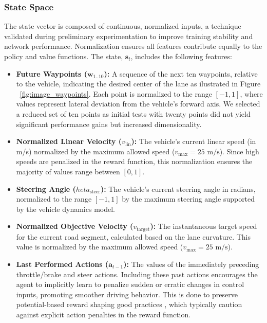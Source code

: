 \documentclass[]{interact}
\begin{document}
\subsubsection{State Space}
The state vector is composed of continuous, normalized inputs, a technique validated during preliminary experimentation to improve training stability and network performance. Normalization ensures all features contribute equally to the policy and value functions. The state, $\mathbf{s}_t$, includes the following features:

\begin{itemize}

    \item \textbf{Future Waypoints ($\mathbf{w}_{1..10}$):} A sequence of the next ten waypoints, relative to the vehicle, indicating the desired center of the lane as ilustrated in Figure ~\ref{fig:image_waypoints}. Each point is normalized to the range $[-1, 1]$, where values represent lateral deviation from the vehicle's forward axis. We selected a reduced set of ten points as initial tests with twenty points did not yield significant performance gains but increased dimensionality.

    \item \textbf{Normalized Linear Velocity ($v_{\text{lin}}$):} The vehicle's current linear speed (in m/s) normalized by the maximum allowed speed ($v_{\text{max}}=25\text{ m/s}$). Since high speeds are penalized in the reward function, this normalization ensures the majority of values range between $[0, 1]$.

    \item \textbf{Steering Angle ($	heta_{\text{steer}}$):} The vehicle's current steering angle in radians, normalized to the range $[-1, 1]$ by the maximum steering angle supported by the vehicle dynamics model.

    \item \textbf{Normalized Objective Velocity ($v_{\text{target}}$):} The instantaneous target speed for the current road segment, calculated based on the lane curvature. This value is normalized by the maximum allowed speed ($v_{\text{max}}=25\text{ m/s}$).

    \item \textbf{Last Performed Actions ($\mathbf{a}_{t-1}$):} The values of the immediately preceding throttle/brake and steer actions. Including these past actions encourages the agent to implicitly learn to penalize sudden or erratic changes in control inputs, promoting smoother driving behavior. This is done to preserve potential-based reward shaping good practices \cite{muller2025improving}, which typically caution against explicit action penalties in the reward function.
\end{itemize}
\end{document}

